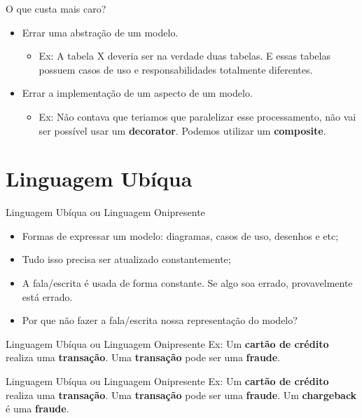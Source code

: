 \documentclass[aspectratio=169]{beamer}
\begin{document}
\begin{frame}{O que custa mais caro?}	
	\begin{multicols}{2}		
		\begin{itemize}	
			\item Errar uma abstração de um modelo.
			\begin{itemize}	
				\item Ex: A tabela X deveria ser na verdade duas tabelas. E essas tabelas possuem casos de uso e responsabilidades totalmente diferentes.
			\end{itemize}
		\end{itemize}
		\begin{itemize}	
			\item Errar a implementação de um aspecto de um modelo.
			\begin{itemize}	
				\item Ex: Não contava que teriamos que paralelizar esse processamento, não vai ser possível usar um \textbf{decorator}. Podemos utilizar um \textbf{composite}.
			\end{itemize}
		\end{itemize}
	\end{multicols}
\end{frame}

\section{Linguagem Ubíqua}
\begin{frame}{Linguagem Ubíqua ou Linguagem Onipresente}	
	\begin{itemize}	
		\item Formas de expressar um modelo: diagramas, casos de uso, desenhos e etc;
		\item Tudo isso precisa ser atualizado constantemente;
		\item A fala/escrita é usada de forma constante. Se algo soa errado, provavelmente está errado.
		\item Por que não fazer a fala/escrita nossa representação do modelo?
	\end{itemize}
\end{frame}

\begin{frame}{Linguagem Ubíqua ou Linguagem Onipresente}
	Ex: Um \textbf{cartão de crédito} realiza uma \textbf{transação}. Uma \textbf{transação} pode ser uma \textbf{fraude}.
\end{frame}

\begin{frame}[noframenumbering]{Linguagem Ubíqua ou Linguagem Onipresente}
	Ex: Um \textbf{cartão de crédito} realiza uma \textbf{transação}. Uma \textbf{transação} pode ser uma \textbf{fraude}. Um \textbf{chargeback} é uma \textbf{fraude}.
\end{frame}
\end{document}
